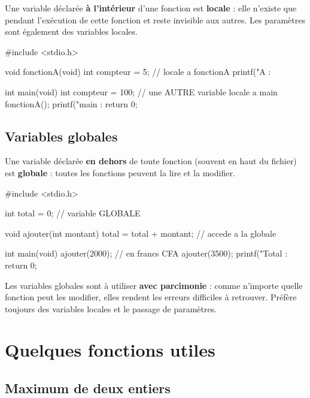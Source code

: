 Une variable déclarée \textbf{à l'intérieur} d'une fonction est \textbf{locale} :
elle n'existe que pendant l'exécution de cette fonction et reste invisible aux
autres. Les paramètres sont également des variables locales.

\begin{codec}
#include <stdio.h>

void fonctionA(void) {
    int compteur = 5;    // locale a fonctionA
    printf("A : %
}

int main(void) {
    int compteur = 100;  // une AUTRE variable locale a main
    fonctionA();
    printf("main : %
    return 0;
}
\end{codec}

\subsection{Variables globales}

Une variable déclarée \textbf{en dehors} de toute fonction (souvent en haut du
fichier) est \textbf{globale} : toutes les fonctions peuvent la lire et la
modifier.

\begin{codec}
#include <stdio.h>

int total = 0;           // variable GLOBALE

void ajouter(int montant) {
    total = total + montant;   // accede a la globale
}

int main(void) {
    ajouter(2000);       // en francs CFA
    ajouter(3500);
    printf("Total : %
    return 0;
}
\end{codec}

\begin{attention}
Les variables globales sont à utiliser \textbf{avec parcimonie} : comme n'importe
quelle fonction peut les modifier, elles rendent les erreurs difficiles à
retrouver. Préfère toujours des variables locales et le passage de paramètres.
\end{attention}

\section{Quelques fonctions utiles}

\subsection{Maximum de deux entiers}

